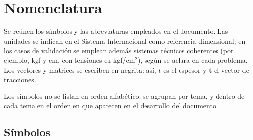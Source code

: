 
\chapter*{Nomenclatura}

Se reúnen los símbolos y las abreviaturas empleados en el documento. Las
unidades se indican en el Sistema Internacional como referencia dimensional;
en los casos de validación se emplean además sistemas técnicos coherentes
(por ejemplo, kgf y cm, con tensiones en kgf/cm$^2$), según se aclara en cada problema.
Los vectores y matrices se escriben en negrita: así, $t$ es el espesor y $\bm{t}$ el
vector de tracciones.

Los símbolos no se listan en orden alfabético: se agrupan por tema, y dentro de cada
tema en el orden en que aparecen en el desarrollo del documento.

\section*{Símbolos}

